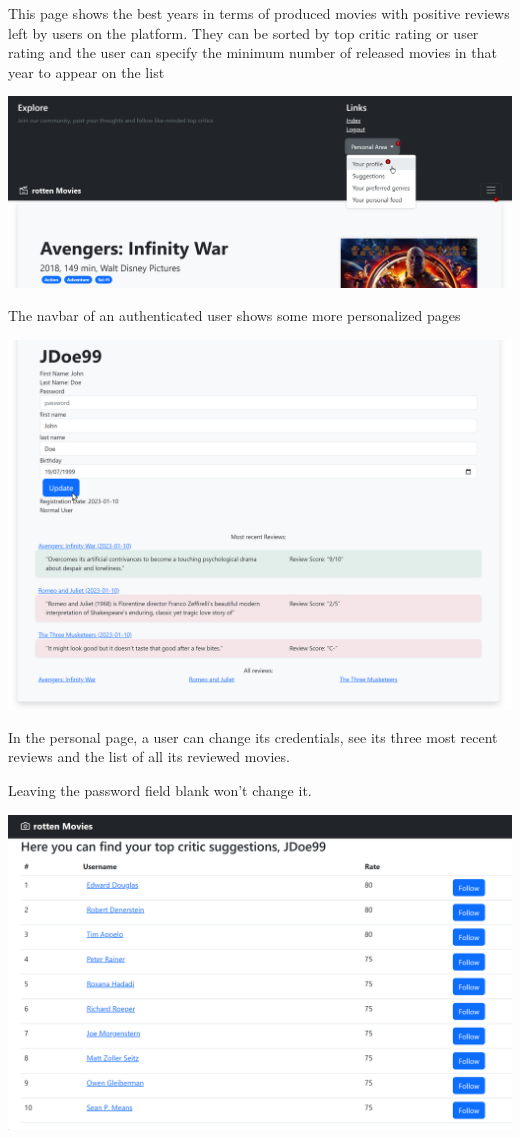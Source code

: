This page shows the best years in terms of produced movies with positive reviews left by users on the platform. They can be sorted by top critic rating or user rating and the user can specify the minimum number of released movies in that year to appear on the list

\includegraphics[scale=0.45]{../../../images/user_manual/authenticated_navbar.png} 

The navbar of an authenticated user shows some more personalized pages

\includegraphics[scale=0.45]{../../../images/user_manual/personal_page.png} 

In the personal page, a user can change its credentials, see its three most recent reviews and the list of all its reviewed movies.

Leaving the password field blank won't change it.

\includegraphics[scale=0.45]{../../../images/user_manual/suggestions.png} 

